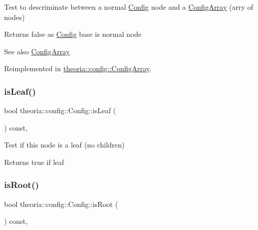 Test to descriminate between a normal \hyperlink{classtheoria_1_1config_1_1Config}{Config} node and a \hyperlink{classtheoria_1_1config_1_1ConfigArray}{Config\+Array} (arry of nodes) \begin{DoxyReturn}{Returns}
false as \hyperlink{classtheoria_1_1config_1_1Config}{Config} base is normal node 
\end{DoxyReturn}
\begin{DoxySeeAlso}{See also}
\hyperlink{classtheoria_1_1config_1_1ConfigArray}{Config\+Array} 
\end{DoxySeeAlso}


Reimplemented in \hyperlink{classtheoria_1_1config_1_1ConfigArray_aa225cf405229bccfcfdf2042e44da4f7}{theoria\+::config\+::\+Config\+Array}.

\mbox{\label{classtheoria_1_1config_1_1Config_ad5c77fb1f86a7df2dce21972f921da33}} 
\subsubsection{\texorpdfstring{is\+Leaf()}{isLeaf()}}
{\footnotesize\ttfamily bool theoria\+::config\+::\+Config\+::is\+Leaf (\begin{DoxyParamCaption}{ }\end{DoxyParamCaption}) const\hspace{0.3cm}{\ttfamily [inline]}, {\ttfamily [noexcept]}}

Test if this node is a leaf (no children) \begin{DoxyReturn}{Returns}
true if leaf 
\end{DoxyReturn}
\mbox{\label{classtheoria_1_1config_1_1Config_ad50b474daddfbec84d7e610f7687fb04}} 
\subsubsection{\texorpdfstring{is\+Root()}{isRoot()}}
{\footnotesize\ttfamily bool theoria\+::config\+::\+Config\+::is\+Root (\begin{DoxyParamCaption}{ }\end{DoxyParamCaption}) const\hspace{0.3cm}{\ttfamily [inline]}, {\ttfamily [noexcept]}}

